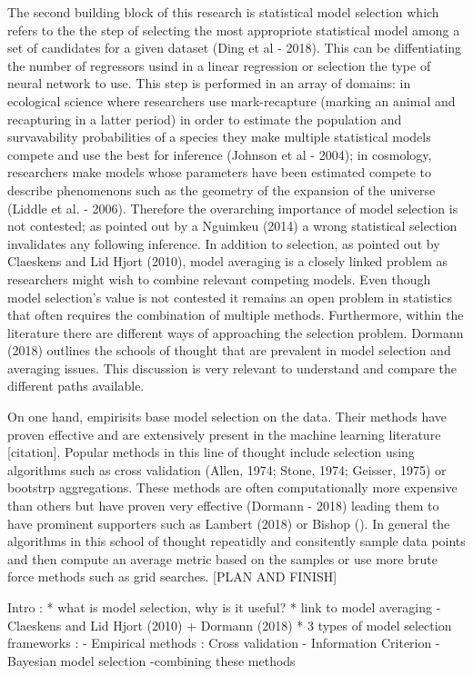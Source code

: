 \documentclass[]{article}
\begin{document}
The second building block of this research is statistical model
selection which refers to the the step of selecting the most appropriote
statistical model among a set of candidates for a given dataset (Ding et
al - 2018). This can be diffentiating the number of regressors usind in
a linear regression or selection the type of neural network to use. This
step is performed in an array of domains: in ecological science where
researchers use mark-recapture (marking an animal and recapturing in a
latter period) in order to estimate the population and survavability
probabilities of a species they make multiple statistical models compete
and use the best for inference (Johnson et al - 2004); in cosmology,
researchers make models whose parameters have been estimated compete to
describe phenomenons such as the geometry of the expansion of the
universe (Liddle et al. - 2006). Therefore the overarching importance of
model selection is not contested; as pointed out by a Nguimkeu (2014) a
wrong statistical selection invalidates any following inference. In
addition to selection, as pointed out by Claeskens and Lid Hjort (2010),
model averaging is a closely linked problem as researchers might wish to
combine relevant competing models. Even though model selection's value
is not contested it remains an open problem in statistics that often
requires the combination of multiple methods. Furthermore, within the
literature there are different ways of approaching the selection
problem. Dormann (2018) outlines the schools of thought that are
prevalent in model selection and averaging issues. This discussion is
very relevant to understand and compare the different paths available.

On one hand, empirisits base model selection on the data. Their methods
have proven effective and are extensively present in the machine
learning literature {[}citation{]}. Popular methods in this line of
thought include selection using algorithms such as cross validation
(Allen, 1974; Stone, 1974; Geisser, 1975) or bootstrp aggregations.
These methods are often computationally more expensive than others but
have proven very effective (Dormann - 2018) leading them to have
prominent supporters such as Lambert (2018) or Bishop (). In general the
algorithms in this school of thought repeatidly and consitently sample
data points and then compute an average metric based on the samples or
use more brute force methods such as grid searches. {[}PLAN AND
FINISH{]}

Intro : * what is model selection, why is it useful? * link to model
averaging - Claeskens and Lid Hjort (2010) + Dormann (2018) * 3 types of
model selection frameworks : - Empirical methods : Cross validation -
Information Criterion - Bayesian model selection -combining these
methods
\end{document}
